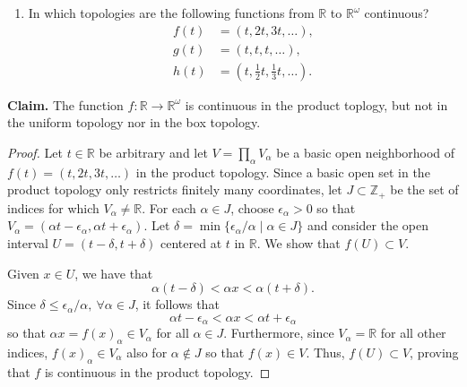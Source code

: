 \documentclass[a4paper,10pt]{article}
\newcommand{\ZZ}{\mathbb{Z}}
\newcommand{\RR}{\mathbb{R}}
\begin{document}
\begin{solution}
    \begin{enumerate}[label={(\alph*)}, align=left, leftmargin=\parindent, listparindent=\parindent, labelwidth=0pt, itemindent=!]
        \item In which topologies are the following functions from $\RR$ to $\RR^\omega$ continuous?
        \begin{align*}
            f(t) &= (t, 2t, 3t, \ldots), \\
            g(t) &= (t, t, t, \ldots), \\
            h(t) &= (t, \tfrac{1}{2} t, \tfrac{1}{3} t, \ldots).
        \end{align*}
    \end{enumerate}
    \textbf{Claim.} The function $f: \RR \rightarrow \RR^\omega$ is continuous in the product toplogy, but not in the uniform topology nor in the box topology.
    \begin{proof}
        Let $t \in \RR$ be arbitrary and let $V = \prod_\alpha V_\alpha$ be a basic open neighborhood of $f(t) = (t, 2t, 3t, \ldots)$ in the product topology.
        Since a basic open set in the product topology only restricts finitely many coordinates, let $J \subset \ZZ_+$ be the set of indices for which $V_\alpha \neq \RR$.
        For each $\alpha \in J$, choose $\epsilon_\alpha > 0$ so that $V_\alpha = (\alpha t - \epsilon_\alpha, \alpha t + \epsilon_\alpha)$.
        Let $\delta = \min\{\epsilon_\alpha / \alpha \mid \alpha \in J\}$ and consider the open interval $U = (t - \delta, t+ \delta)$ centered at $t$ in $\RR$.
        We show that $f(U) \subset V$.

        Given $x \in U$, we have that
        \begin{equation*}
            \alpha (t - \delta) < \alpha x < \alpha (t + \delta).
        \end{equation*}
        Since $\delta \leq \epsilon_{\alpha} / \alpha,~ \forall \alpha \in J$, it follows that
        \begin{equation*}
            \alpha t - \epsilon_\alpha < \alpha x < \alpha t + \epsilon_\alpha
        \end{equation*}
        so that $\alpha x = f(x)_\alpha \in V_\alpha$ for all $\alpha \in J$.
        Furthermore, since $V_\alpha = \RR$ for all other indices, $f(x)_\alpha \in V_\alpha$ also for $\alpha \notin J$ so that $f(x) \in V$.
        Thus, $f(U) \subset V$, proving that $f$ is continuous in the product topology.


\end{proof}
\end{solution}
\end{document}
